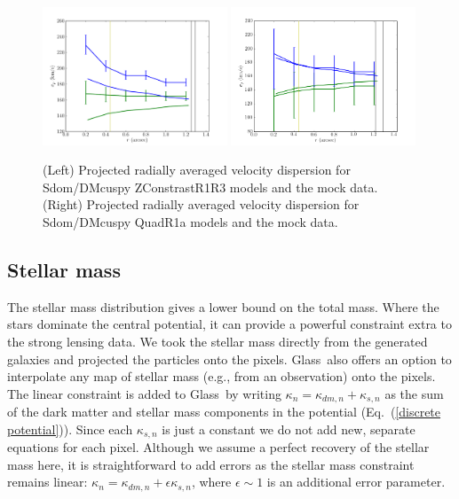 \documentclass[galley,usenatbib]{mn2e}
\newcommand{\Glass}{{\sc Glass}}
\newcommand{\eqnref}[1] {Eq.~(\ref{#1})}
\begin{document}
\begin{figure}
\includegraphics[width=0.49\textwidth]{BCZContrastR1R3_TmS_sb.pdf}
\includegraphics[width=0.49\textwidth]{BCQuadR1a_TmS_sb.pdf}
\caption{ 
(Left) Projected radially averaged velocity dispersion for Sdom/DMcuspy ZConstrastR1R3 models and the mock data.
(Right) Projected radially averaged velocity dispersion for Sdom/DMcuspy QuadR1a models and the mock data.
}
\label{main results pixel-wise}
\end{figure}

\subsection{Stellar mass}
\label{stellar mass}

The stellar mass distribution gives a lower bound on the total mass. Where the stars dominate the central potential, it can provide a powerful constraint extra to the strong lensing data. We took the stellar mass directly from
the generated galaxies and projected the particles onto the pixels. \Glass\
also offers an option to interpolate any map of stellar mass (e.g., from an
observation) onto the pixels. The linear constraint is added to \Glass\ by
writing $\kappa_n = \kappa_{dm,n} + \kappa_{s,n}$ as the sum of the
dark matter and stellar mass components in the potential (\eqnref{discrete
potential}). Since each $\kappa_{s,n}$ is just a constant we do not add new,
separate equations for each pixel. Although we assume a perfect recovery of the stellar mass here, it is straightforward to add errors as the stellar mass constraint remains linear: $\kappa_n = \kappa_{dm,n} + \epsilon \kappa_{s,n}$, where $\epsilon \sim 1$ is an additional error parameter. 
\end{document}
